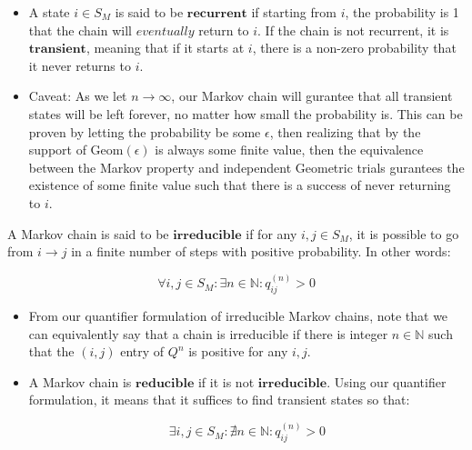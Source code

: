 \begin{itemize}
\item A state $i \in S_M$ is said to be $\textbf{recurrent}$ if starting from $i$, the probability is 1 that the chain will $\textit{eventually}$ return to $i$. If the chain is not recurrent, it is $\textbf{transient}$, meaning that if it starts at $i$, there is a non-zero probability that it never returns to $i$.

\item Caveat: As we let $n \to \infty$, our Markov chain will gurantee that all transient states will be left forever, no matter how small the probability is. This can be proven by letting the probability be some $\epsilon$, then realizing that by the support of $\text{Geom}(\epsilon)$ is always some finite value, then the equivalence between the Markov property and independent Geometric trials gurantees the existence of some finite value such that there is a success of never returning to $i$.
\end{itemize}

\begin{definition}[Reducibility] A Markov chain is said to be $\textbf{irreducible}$ if for any $i,j \in S_M$, it is possible to go from $i \to j$ in a finite number of steps with positive probability. In other words:
\end{definition}

$$\forall i,j \in S_M: \exists n \in \mathbb{N} : q_{ij}^{(n)} > 0$$
\begin{itemize}
\item From our quantifier formulation of irreducible Markov chains, note that we can equivalently say that a chain is irreducible if there is integer $n \in \mathbb{N}$ such that the $(i,j)$ entry of $Q^n$ is positive for any $i,j$.

\item A Markov chain is $\textbf{reducible}$ if it is not $\textbf{irreducible}$. Using our quantifier formulation, it means that it suffices to find transient states so that:

$$\exists i,j \in S_M: \nexists n \in \mathbb{N} : q_{ij}^{(n)} > 0$$
\end{itemize}
